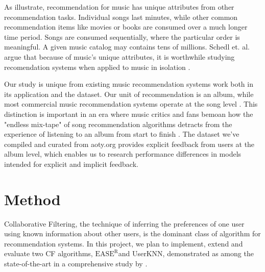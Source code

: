 \documentclass{article}
\newcommand{\easer}{$\text{EASE}^\text{R}$}
\newcommand{\userknn}{UserKNN\xspace}
\begin{document}
As \citet{Schedl2018} illustrate, recommendation for music has unique
 attributes from other recommendation tasks.
Individual songs last minutes, while other common recommendation items like
 movies or books are consumed over a much longer time period.
Songs are consumed sequentially, where the particular order is meaningful.
A given music catalog may contains tens of millions.
Schedl et.
al. argue that because of music's unique attributes, it is
worthwhile
studying recomendation systems when applied to music
in isolation \citep{Schedl2018}.

Our study is unique from existing music recommendation systems work both in its
 application and the dataset.
Our unit of recommendation is an album, while most commercial music
 recommendation systems operate at the song level \citep{Schedl2018}.
This distinction is important in an era where music critics and fans bemoan how
 the "endless mix-tape" of song recommendation algorithms detracts from the
 experience of listening to an album from start to finish
 \citep{toth2018,hilton2013}.
The dataset we've compiled and curated from aoty.org provides explicit feedback
 from users at the album level, which enables us to research performance
 differences in models intended for explicit and implicit feedback.

\section{Method}
Collaborative Filtering, the technique of inferring the preferences of one user
 using known information about other users, is the dominant class of algorithm
 for recommendation systems.
In this project, we plan to implement, extend and evaluate two CF algorithms,
 \easer and \userknn, demonstrated as among the state-of-the-art in a
 comprehensive study by \citet{anelliTopNRecommendationAlgorithms2022}.
\end{document}
